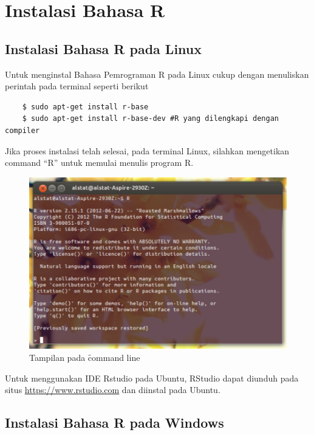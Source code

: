 \section{Instalasi Bahasa R}

\subsection{Instalasi Bahasa R pada Linux}

Untuk menginstal Bahasa Pemrograman R pada Linux  cukup dengan menuliskan perintah pada terminal seperti berikut
\begin{lstlisting} 
	$ sudo apt-get install r-base
	$ sudo apt-get install r-base-dev #R yang dilengkapi dengan compiler 
\end{lstlisting}
Jika proses instalasi telah selesai, pada terminal Linux, silahkan mengetikan command “R” untuk memulai menulis program R.
\begin{figure}
\centering
\includegraphics[width=0.7\linewidth]{./pics/instal}
\caption{Tampilan pada \f{command line}}
\label{fig:instal}
\end{figure}


Untuk menggunakan IDE Rstudio pada Ubuntu, RStudio dapat diunduh pada situs \url{https://www.rstudio.com} dan diinstal pada Ubuntu.

\subsection{Instalasi Bahasa R pada Windows}

